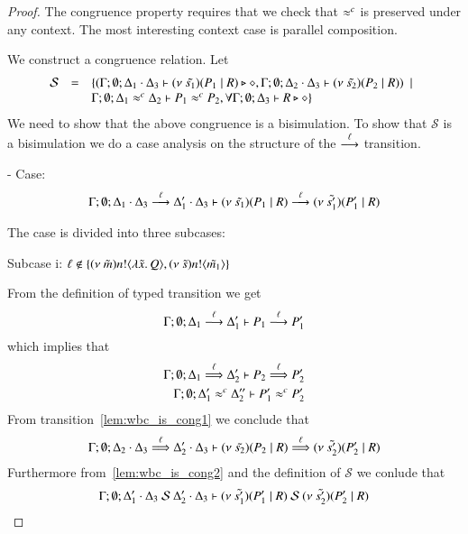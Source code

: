 \begin{proof}

	\noi The congruence property requires that we check that $\approx^{c}$
	is preserved under any context.
	The most interesting context case is parallel composition.

	\noi We construct a congruence relation. Let
	\[
	\begin{array}{rcl}
		\mathcal{S} &=&	\{(\Gamma; \emptyset; \Delta_1 \cdot \Delta_3 \vdash (\nu\ \tilde{s_1})(P_1 \;|\; R) \triangleright \diamond, \Gamma; \emptyset; \Delta_2 \cdot \Delta_3 \vdash (\nu\ \tilde{s_2})(P_2 \;|\; R)) \ \ |\ \  \\
		& &	\Gamma;\emptyset;\Delta_1 \approx^{c} \Delta_2 \vdash P_1 \approx^{c} P_2, \forall \Gamma; \emptyset; \Delta_3 \vdash R \triangleright \diamond\}
	\end{array}
	\]
	\noi We need to show that the above congruence is a bisimulation.
	To show that $\mathcal{S}$ is a bisimulation we do a case analysis on the structure
	of the $\stackrel{\ell}{\longrightarrow}$ transition.


	\noi - Case: 
	\[
		\Gamma; \emptyset; \Delta_1 \cdot \Delta_3 \stackrel{\ell}{\longrightarrow} \Delta_1' \cdot \Delta_3 \vdash (\nu\ \tilde{s_1})(P_1 \;|\; R) \stackrel{\ell}{\longrightarrow} (\nu\ \tilde{s_1'})(P_1' \;|\; R)
	\]

	\noi The case is divided into three subcases:

	\noi Subcase i: $\ell \notin \{(\nu\ \tilde{m}) n ! \langle \lambda \tilde{x}.\,Q \rangle, (\nu\ \tilde{s}) n ! \langle \tilde{m_1} \rangle\}$

	\noi From the definition of typed transition we get
	\[
		\Gamma; \emptyset; \Delta_1 \stackrel{\ell}{\longrightarrow} \Delta_1' \vdash P_1 \stackrel{\ell}{\longrightarrow} P_1'
	\]
	\noi which implies that
%
	\begin{eqnarray}
		\Gamma; \emptyset; \Delta_1 \stackrel{\ell}{\Longrightarrow} \Delta_2' \vdash P_2 \stackrel{\ell}{\Longrightarrow} P_2' \label{lem:wbc_is_cong1}\\
		\Gamma; \emptyset; \Delta_1' \approx^{c} \Delta_2'' \vdash P_1' \approx^{c} P_2' \label{lem:wbc_is_cong2}
	\end{eqnarray}
%
	\noi From transition~\ref{lem:wbc_is_cong1} we conclude that 
	\[
		\Gamma;\emptyset; \Delta_2 \cdot \Delta_3 \stackrel{\ell}{\Longrightarrow} \Delta_2' \cdot \Delta_3 \vdash (\nu\ \tilde{s_2})(P_2 \;|\; R) \stackrel{\ell}{\Longrightarrow} (\nu\ \tilde{s_2'})(P_2' \;|\; R)
	\]
%
	\noi Furthermore from~\ref{lem:wbc_is_cong2} and the definition of $\mathcal{S}$ we conlude that
	\[
		\Gamma; \emptyset; \Delta_1' \cat \Delta_3\ \mathcal{S}\ \Delta_2' \cat \Delta_3 \proves \newsp{\tilde{s_1'}}{P_1' \Par R}\ \mathcal{S}\ \newsp{\tilde{s_2'}}{P_2' \Par R}
	\]


\end{proof}
